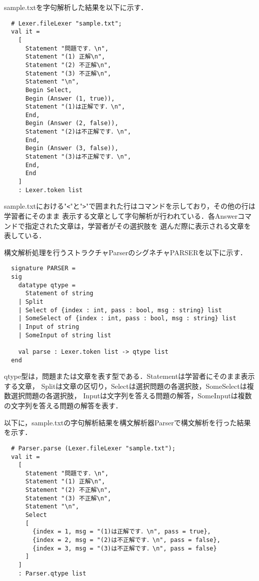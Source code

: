 \documentclass{jreport}
\begin{document}
sample.txtを字句解析した結果を以下に示す．

\begin{Verbatim}
  # Lexer.fileLexer "sample.txt";
  val it =
    [
      Statement "問題です．\n",
      Statement "(1) 正解\n",
      Statement "(2) 不正解\n",
      Statement "(3) 不正解\n",
      Statement "\n",
      Begin Select,
      Begin (Answer (1, true)),
      Statement "(1)は正解です．\n",
      End,
      Begin (Answer (2, false)),
      Statement "(2)は不正解です．\n",
      End,
      Begin (Answer (3, false)),
      Statement "(3)は不正解です．\n",
      End,
      End
    ]
    : Lexer.token list  
\end{Verbatim}

sample.txtにおける"\verb|<|"と"\verb|>|"で囲まれた行はコマンドを示しており，その他の行は学習者にそのまま
表示する文章として字句解析が行われている．各Answerコマンドで指定された文章は，学習者がその選択肢を
選んだ際に表示される文章を表している．

構文解析処理を行うストラクチャParserのシグネチャPARSERを以下に示す．

\begin{Verbatim}
  signature PARSER =
  sig
    datatype qtype =
      Statement of string
    | Split
    | Select of {index : int, pass : bool, msg : string} list
    | SomeSelect of {index : int, pass : bool, msg : string} list
    | Input of string
    | SomeInput of string list
  
    val parse : Lexer.token list -> qtype list
  end
\end{Verbatim}

qtype型は，問題または文章を表す型である．Statementは学習者にそのまま表示する文章，
Splitは文章の区切り，Selectは選択問題の各選択肢，SomeSelectは複数選択問題の各選択肢，
Inputは文字列を答える問題の解答，SomeInputは複数の文字列を答える問題の解答を表す．

以下に，sample.txtの字句解析結果を構文解析器Parserで構文解析を行った結果を示す．

\begin{Verbatim}
  # Parser.parse (Lexer.fileLexer "sample.txt");
  val it =
    [
      Statement "問題です．\n",
      Statement "(1) 正解\n",
      Statement "(2) 不正解\n",
      Statement "(3) 不正解\n",
      Statement "\n",
      Select
      [
        {index = 1, msg = "(1)は正解です．\n", pass = true},
        {index = 2, msg = "(2)は不正解です．\n", pass = false},
        {index = 3, msg = "(3)は不正解です．\n", pass = false}
      ]
    ]
    : Parser.qtype list  
\end{Verbatim}
\end{document}
